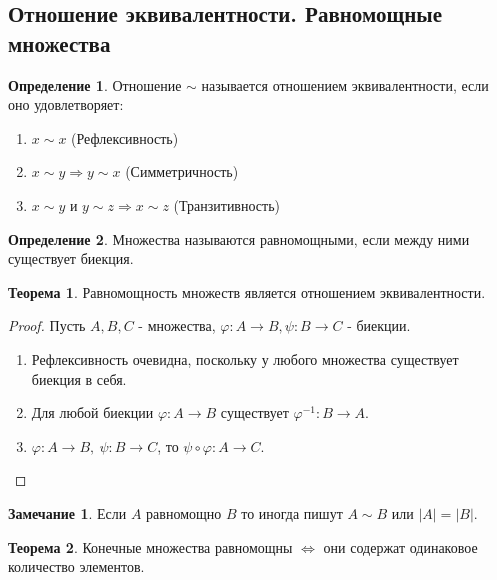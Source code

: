 \documentclass[a4paper, 12pt]{article}
\renewcommand{\phi}{\varphi}
\theoremstyle{definition}
\newtheorem*{definition}{Определение}
\newtheorem*{theorem}{Теорема}
\newtheorem*{comm}{Замечание}
\begin{document}
        \subsection{Отношение эквивалентности. Равномощные множества}
        \begin{definition}
            Отношение $\sim$ называется отношением эквивалентности, если оно удовлетворяет:
            \begin{enumerate}
                \item $x\sim x$ (Рефлексивность)
                \item $x\sim y \Rightarrow y\sim x$ (Симметричность)
                \item $x\sim y$ и $y\sim z\Rightarrow x\sim z$ (Транзитивность)
            \end{enumerate}
        \end{definition} 
        \begin{definition}
            Множества называются равномощными, если между ними существует биекция.
        \end{definition}
        \begin{theorem}
            Равномощность множеств является отношением эквивалентности.
        \end{theorem}
        \begin{proof} Пусть $A,B,C$ - множества, $\phi:A\to B, \psi:B\to C$ - биекции.
            \begin{enumerate}
                \item Рефлексивность очевидна, поскольку у любого множества существует биекция в себя.
                \item Для любой биекции $\phi:A\to B$ существует $\phi^{-1}:B\to A$.
                \item $\phi:A\to B,\ \psi:B\to C$, то $\psi \circ \phi: A\to C$.
            \end{enumerate}
        \end{proof} 
        \begin{comm}
            Если $A$ равномощно $B$ то иногда пишут $A\sim B$ или $|A|=|B|$.
        \end{comm} 
        \begin{theorem}
            Конечные множества равномощны $\Leftrightarrow$ они содержат одинаковое количество элементов.
        \end{theorem}
\end{document}
